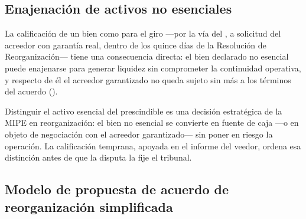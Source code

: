 \subsection{Enajenación de activos no esenciales}

La calificación de un bien como  para el giro ---por la vía del ,
a solicitud del acreedor con garantía real, dentro de los quince días de la Resolución de
Reorganización--- tiene una consecuencia directa: el bien declarado no esencial puede
enajenarse para generar liquidez sin comprometer la continuidad operativa, y respecto de él el
acreedor garantizado no queda sujeto sin más a los términos del acuerdo ().

\begin{foco}
Distinguir el activo esencial del prescindible es una decisión estratégica de la MIPE en
reorganización: el bien no esencial se convierte en fuente de caja ---o en objeto de negociación
con el acreedor garantizado--- sin poner en riesgo la operación. La calificación temprana,
apoyada en el informe del veedor, ordena esa distinción antes de que la disputa la fije el
tribunal.
\end{foco}

\bloquePractico

\subsection{Modelo de propuesta de acuerdo de reorganización simplificada}

